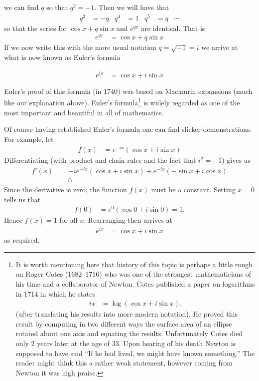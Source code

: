 we can find $q$ so that $q^2=-1$. Then we will have that
\begin{align*}
  q^3 &= -q & q^4 &= 1 & q^5 &= q & \cdots
\end{align*}
so that the series for $\cos x + q\sin x$ and $e^{q x}$ are
identical. That is
\begin{align*}
  e^{qx}
  &= \cos x + q\sin x
\end{align*}
If we now write this with the more usual notation $q=\sqrt{-1}=i$ we
arrive at what is now known as Euler's formula
\begin{impeqn}
 \begin{align*}
  e^{i x} &= \cos x + i \sin x
\end{align*}
\end{impeqn}
Euler's proof of this formula (in 1740) was based on Maclaurin expansions (much like our explanation above). Euler's
formula\footnote{It is worth mentioning here that history of this topic is perhaps a little rough on Roger Cotes
(1682--1716) who was one of the strongest mathematicians of his time and a collaborator of Newton. Cotes published a
paper on logarithms in 1714 in which he states
\begin{align*}
  ix &= \log( \cos x + i \sin x).
\end{align*}
(after translating his results into more modern notation). He proved this result by computing in two different ways
the surface area of an ellipse rotated about one axis and equating the results. Unfortunately Cotes died only 2 years
later at the age of 33. Upon hearing of his death Newton is supposed to have said ``If he had lived, we might have
known something.'' The reader might think this a rather weak statement, however coming from Newton it was high praise.
} is widely regarded as one of the most important and
beautiful in all of mathematics.


Of course having established Euler's formula one can find slicker demonstrations. For example, let
\begin{align*}
  f(x) &= e^{-ix} \left(\cos x + i\sin x \right)
\end{align*}
Differentiating (with product and chain rules and the fact that $i^2=-1$) gives us
\begin{align*}
  f'(x) &= -i e^{-ix} \left(\cos x + i\sin x \right) + e^{-ix} \left(-\sin x + i\cos x \right)\\
  &= 0
\end{align*}
Since the derivative is zero, the function $f(x)$ must be a constant. Setting $x=0$ tells us that
\begin{align*}
  f(0) &= e^0 \left(\cos 0 + i\sin 0 \right) = 1.
\end{align*}
Hence $f(x)=1$ for all $x$. Rearranging then arrives at
\begin{align*}
  e^{ix} &= \cos x + i \sin x
\end{align*}
as required.

